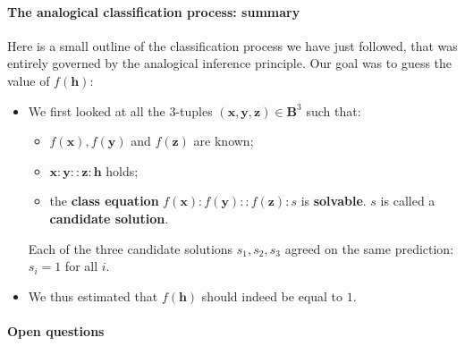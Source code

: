 \paragraph{The analogical classification process: summary\\}

Here is a small outline of the classification process we have just followed,
that was entirely governed by the analogical inference principle. Our goal was
to guess the value of $f(\mathbf{h})$:

\begin{itemize}
  \item We first looked at all the $3$-tuples $(\mathbf{x}, \mathbf{y}, \mathbf{z}) \in
    \mathbf{B}^3$ such that:
    \begin{itemize}
      \item $f(\mathbf{x}), f(\mathbf{y})$ and $f(\mathbf{z})$ are known;
      \item $\mathbf{x}:\mathbf{y}::\mathbf{z}:\mathbf{h}$ holds;
      \item the \textbf{class equation} $f(\mathbf{x}) :f(\mathbf{y}) ::
        f(\mathbf{z}) :s$ is \textbf{solvable}. $s$ is called a
        \textbf{candidate solution}.
    \end{itemize}
    Each of the three candidate solutions $s_1, s_2, s_3$ agreed on the same prediction:
    $s_i = 1$ for all $i$.
  \item We thus estimated that $f(\mathbf{h})$ should indeed be equal to $1$.
\end{itemize}

\paragraph{Open questions\\}

